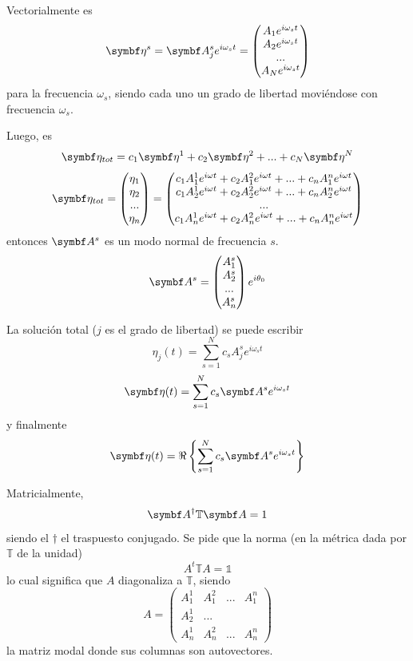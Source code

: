 \documentclass[10pt,oneside]{CBFT_book}
\begin{document}
Vectorialmente es 
\[
	\vb{\eta}^s = \vb{A}_j^s e^{i\omega_s t} = \begin{pmatrix}
	                A_1 e^{i\omega_s t} \\
	                A_2 e^{i\omega_s t} \\
	                ... \\
	                A_N e^{i\omega_s t} \\
	               \end{pmatrix}
\]
para la frecuencia $\omega_s$, siendo cada uno un grado de libertad moviéndose con frecuencia $\omega_s$.

Luego, es
\[
	\vb{\eta}_{tot} = c_1 \vb{\eta}^1 + c_2 \vb{\eta}^2 + ... + c_N \vb{\eta}^N
\]
\[
	\vb{\eta}_{tot} = \begin{pmatrix}
				\eta_1 \\
				\eta_2 \\
				... \\
				\eta_n 
	                  \end{pmatrix}
	                 = \begin{pmatrix}
				c_1 A_1^1 e^{i\omega t} + c_2 A_1^2 e^{i\omega t} + ... + c_n A_1^n e^{i\omega t} \\
				c_1 A_2^1 e^{i\omega t} + c_2 A_2^2 e^{i\omega t} + ... + c_n A_2^n e^{i\omega t} \\
				... \\
				c_1 A_n^1 e^{i\omega t} + c_2 A_n^2 e^{i\omega t} + ... + c_n A_n^n e^{i\omega t}
	                  \end{pmatrix}
\]
entonces $\vb{A}^s$ es un modo normal de frecuencia $s$.
\[
	\vb{A}^s = \begin{pmatrix}
	            A_1^s \\
	            A_2^s \\
	            ... \\
	            A_n^s
	           \end{pmatrix}
	           e^{i\theta_0}
\]

La solución total ($j$ es el grado de libertad) se puede escribir 
\[
	\eta_j(t) = \sum_{s=1}^N c_s A_j^s e^{i\omega_s t}
\]
\[
	\vb{\eta}(t) = \sum_{s=1}^N c_s \vb{A}^s e^{i\omega_s t}
\]
y finalmente 
\[
	\vb{\eta}(t) = \Re \left\{ \sum_{s=1}^N c_s \vb{A}^s e^{i\omega_s t} \right\}
\]

Matricialmente,
\[
	\vb{A}^\dagger \mathbb{T} \vb{A} = 1
\]
siendo el $\dagger$ el traspuesto conjugado. Se pide que la norma (en la métrica dada por $\mathbb{T}$ de la unidad)
\[
	A^t \mathbb{T} A = \mathbb{1}
\]
lo cual significa que $A$ diagonaliza a $\mathbb{T}$, siendo 
\[
	A = \begin{pmatrix}
	     A_1^1 & A_1^2 & ... & A_1^n \\
	     A_2^1 & ... \\
	     A_n^1 & A_n^2 & ... & A_n^n 
	    \end{pmatrix}
\]
la matriz modal donde sus columnas son autovectores.
\end{document}
